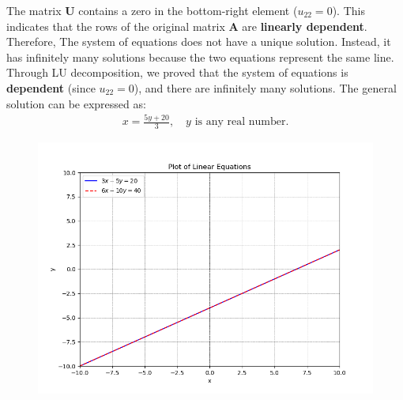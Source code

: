 \documentclass[journal,12pt,onecolumn]{IEEEtran}
\theoremstyle{remark}
\begin{document}
The matrix $\mathbf{U}$ contains a zero in the bottom-right element ($u_{22} = 0$). This indicates that the rows of the original matrix $\mathbf{A}$ are \textbf{linearly dependent}. Therefore, The system of equations does not have a unique solution. Instead, it has infinitely many solutions because the two equations represent the same line.
Through LU decomposition, we proved that the system of equations is \textbf{dependent} (since $u_{22} = 0$), and there are infinitely many solutions. The general solution can be expressed as:
\begin{align}
x = \frac{5y + 20}{3}, \quad y \text{ is any real number.}
\end{align}


\begin{figure}[ht]
    \centering
    \includegraphics[width=\columnwidth]{figs/lines.png} 
    \label{fig:image_label}
\end{figure}
\end{document}
